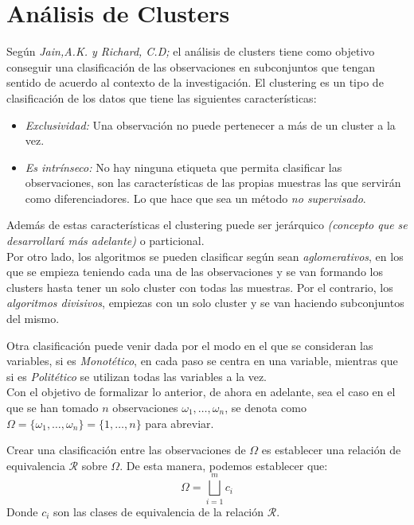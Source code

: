 \section{Análisis de Clusters}

\noindent Según \emph{Jain,A.K. y Richard, C.D; }\cite{Jain 1988} el análisis de clusters tiene como objetivo conseguir una clasificación de las observaciones en subconjuntos que tengan sentido de acuerdo al contexto de la investigación. El clustering es un tipo de clasificación de los datos que tiene las siguientes características:
\begin{itemize}
\item \textit{Exclusividad: }Una observación no puede pertenecer a más de un cluster a la vez. 
\item \textit{Es intrínseco: }No hay ninguna etiqueta que permita clasificar las observaciones, son las características de las propias muestras las que servirán como diferenciadores. Lo que hace que sea un método \textit{no supervisado}.
\end{itemize}
Además de estas características el clustering puede ser jerárquico \textit{(concepto que se desarrollará más adelante)} o particional. \\
\noindent Por otro lado, los algoritmos se pueden clasificar según  sean \textit{aglomerativos}, en los que se empieza teniendo cada una de las observaciones y se van formando los clusters hasta tener un solo cluster con todas las muestras. Por el contrario, los \textit{algoritmos   divisivos}, empiezas con un solo cluster y se van haciendo subconjuntos del mismo.  

\noindent Otra clasificación puede venir dada por el modo en el que se consideran las  variables, si es \textit{Monotético}, en cada paso se centra en una variable, mientras que si es \textit{Politético} se utilizan todas las variables a la vez.\\


\noindent Con el objetivo de formalizar lo anterior, de ahora en adelante, sea el caso en el que se han tomado $n$ observaciones $\omega_1,\ldots, \omega_n$, se denota como $\Omega=\lbrace\omega_1,\ldots, \omega_n\rbrace=\lbrace 1,\ldots, n\rbrace$ para abreviar. 

\noindent Crear una clasificación entre las observaciones de $\Omega$ es establecer una relación de equivalencia $\mathcal{R}$ sobre $\Omega$. De esta manera, podemos establecer que:
\begin{equation}
\Omega=\bigsqcup_{i=1}^m c_i
\end{equation}
\noindent Donde $c_i$ son las clases de equivalencia de la relación $\mathcal{R}$.

